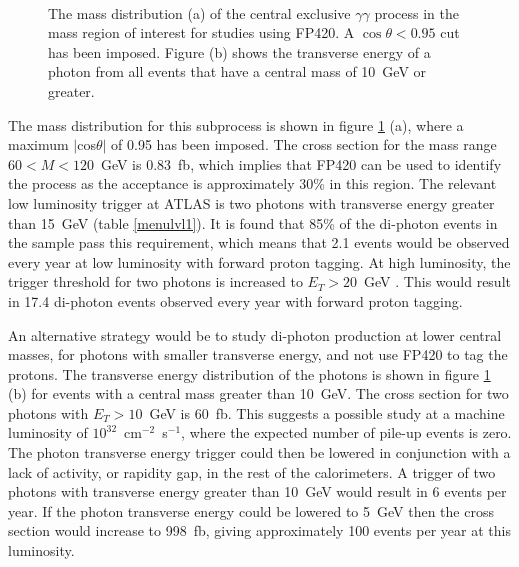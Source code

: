\begin{figure} 
\centering
\mbox{
	\quad
	}
\caption[The mass and transverse energy distributions of the $gg\rightarrow \gamma \gamma$ process in ExHuME]{The mass distribution (a) of the central exclusive $\gamma \gamma$ process in the mass region of interest for studies using FP420. A $\cos\theta<0.95$ cut has been imposed. Figure (b) shows the transverse energy of a photon from all events that have a central mass of 10~GeV or greater. \label{massdiphot}}
\end{figure}

The mass distribution for this subprocess is shown in figure \ref{massdiphot} (a), where a maximum $|$cos$\theta|$ of 0.95 has been imposed. The cross section for the mass range $60<M<120$~GeV is 0.83~fb, which implies that FP420 can be used to identify the process as the acceptance is approximately 30\% in this region. 
The relevant low luminosity trigger at ATLAS is two photons with transverse energy greater than 15~GeV (table \ref{menulvl1}). It is found that 85\% of the di-photon events in the sample pass this requirement, 
which means that 2.1 events would be observed every year at low luminosity with forward proton tagging. At high luminosity, the trigger threshold for two photons is increased to $E_T>20$~GeV \cite{:1999fq:Chapter11}. This would result in 17.4 di-photon events observed every year with forward proton tagging.

An alternative strategy would be to study di-photon production at lower central masses, for photons with smaller transverse energy, and not use FP420 to tag the protons.
The transverse energy distribution of the photons is shown in figure \ref{massdiphot} (b) for events with a central mass greater than 10~GeV. The cross section for two photons with $E_T>10$~GeV is 60~fb. This suggests a possible study at a machine luminosity of $10^{32}$~cm$^{-2}$~s$^{-1}$, where the expected number of pile-up events is zero. The photon transverse energy trigger could then be lowered in conjunction with a lack of activity, or rapidity gap, in the rest of the calorimeters. A trigger of two photons with transverse energy greater than 10~GeV would result in 6 events per year. If the photon transverse energy could be lowered to 5~GeV then the cross section would increase to 998~fb, giving approximately 100 events per year at this luminosity. 






